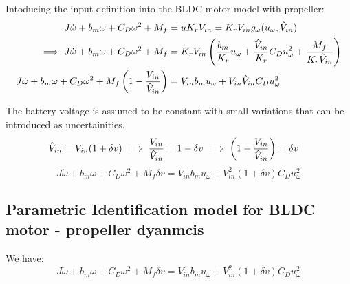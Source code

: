 Intoducing the input definition into the BLDC-motor model with propeller:
\begin{align*}
    J\dot \omega + b_m \omega + C_D \omega^2 + M_f &= u K_r V_{in} = K_r V_{in} g_\omega(u_\omega, \hat V_{in})\\
    \implies  J \dot \omega + b_m \omega + C_D \omega^2 + M_f &= K_r V_{in} \left( \frac{b_m}{K_r} u_\omega + \frac{\hat V_{in}}{K_r} C_D u_\omega^2 + \frac{M_f}{K_r  \hat V_{in}} \right)\\
    J \dot \omega + b_m \omega + C_D \omega^2 + M_f \left( 1 - \frac{V_{in}}{\hat V_{in}} \right) &= V_{in} b_m u_\omega + V_{in} \hat V_{in} C_D u_\omega^2
\end{align*}

 The battery voltage is assumed to be constant with small variations that can be introduced as uncertainities.
\begin{align*}
    \hat V_{in} &= V_{in} ( 1 + \delta v)
    \implies \frac{V_{in}}{\hat V_{in}} = 1 - \delta v
    \implies \left( 1 - \frac{V_{in}}{\hat V_{in}} \right) = \delta v
\end{align*}
\begin{equation}
    J \dot \omega + b_m \omega + C_D \omega^2 + M_f \delta v = V_{in} b_m u_\omega + V_{in}^2 (1 + \delta v) C_D u_\omega^2
\end{equation}

\subsection{Parametric Identification model for BLDC motor - propeller dyanmcis}
We have:
\begin{equation*}
    J \dot \omega + b_m \omega + C_D \omega^2 + M_f \delta v = V_{in} b_m u_\omega + V_{in}^2 (1 + \delta v) C_D u_\omega^2
\end{equation*}

